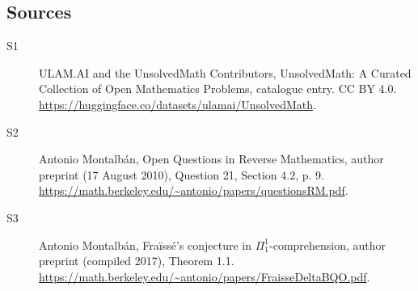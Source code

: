 \documentclass[11pt]{article}
\begin{document}
\subsection{Sources}
\begin{description}
\item[\hypertarget{source:statement:1}{S1}] ULAM.AI and the UnsolvedMath Contributors, UnsolvedMath: A Curated Collection of Open Mathematics Problems, catalogue entry. CC BY 4.0. \url{https://huggingface.co/datasets/ulamai/UnsolvedMath}.
\item[\hypertarget{source:statement:2}{S2}] Antonio Montalbán, Open Questions in Reverse Mathematics, author preprint (17 August 2010), Question 21, Section 4.2, p. 9. \url{https://math.berkeley.edu/~antonio/papers/questionsRM.pdf}.
\item[\hypertarget{source:statement:3}{S3}] Antonio Montalbán, Fraïssé's conjecture in $\Pi^1_1$-comprehension, author preprint (compiled 2017), Theorem 1.1. \url{https://math.berkeley.edu/~antonio/papers/FraisseDeltaBQO.pdf}.
\end{description}
\label{end:statement}
\end{document}
